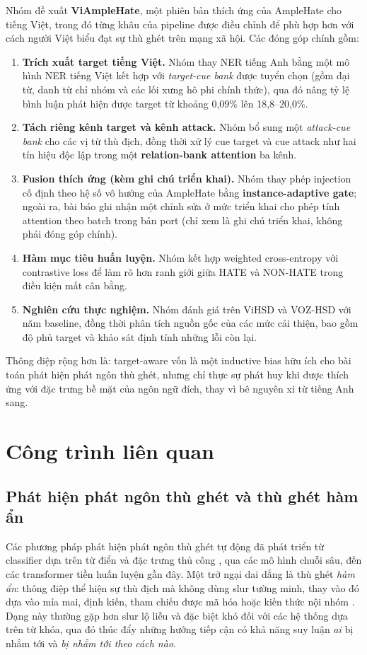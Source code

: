 \documentclass[11pt]{article}
\begin{document}
Nhóm đề xuất \textbf{ViAmpleHate}, một phiên bản thích ứng của AmpleHate cho tiếng Việt, trong đó từng khâu của pipeline được điều chỉnh để phù hợp hơn với cách người Việt biểu đạt sự thù ghét trên mạng xã hội. Các đóng góp chính gồm:
\begin{enumerate}
  \item \textbf{Trích xuất target tiếng Việt.} Nhóm thay NER tiếng Anh bằng một mô hình NER tiếng Việt kết hợp với \emph{target-cue bank} được tuyển chọn (gồm đại từ, danh từ chỉ nhóm và các lối xưng hô phi chính thức), qua đó nâng tỷ lệ bình luận phát hiện được target từ khoảng 0,09\% lên 18,8--20,0\%.
  \item \textbf{Tách riêng kênh target và kênh attack.} Nhóm bổ sung một \emph{attack-cue bank} cho các vị từ thù địch, đồng thời xử lý cue target và cue attack như hai tín hiệu độc lập trong một \textbf{relation-bank attention} ba kênh.
  \item \textbf{Fusion thích ứng (kèm ghi chú triển khai).} Nhóm thay phép injection cố định theo hệ số vô hướng của AmpleHate bằng \textbf{instance-adaptive gate}; ngoài ra, bài báo ghi nhận một chỉnh sửa ở mức triển khai cho phép tính attention theo batch trong bản port (chỉ xem là ghi chú triển khai, không phải đóng góp chính).
  \item \textbf{Hàm mục tiêu huấn luyện.} Nhóm kết hợp weighted cross-entropy với contrastive loss để làm rõ hơn ranh giới giữa HATE và NON-HATE trong điều kiện mất cân bằng.
  \item \textbf{Nghiên cứu thực nghiệm.} Nhóm đánh giá trên ViHSD và VOZ-HSD với năm baseline, đồng thời phân tích nguồn gốc của các mức cải thiện, bao gồm độ phủ target và khảo sát định tính những lỗi còn lại.
\end{enumerate}
Thông điệp rộng hơn là: target-aware vốn là một inductive bias hữu ích cho bài toán phát hiện phát ngôn thù ghét, nhưng chỉ thực sự phát huy khi được thích ứng với đặc trưng bề mặt của ngôn ngữ đích, thay vì bê nguyên xi từ tiếng Anh sang.

\section{Công trình liên quan}

\subsection{Phát hiện phát ngôn thù ghét và thù ghét hàm ẩn}
Các phương pháp phát hiện phát ngôn thù ghét tự động đã phát triển từ classifier dựa trên từ điển và đặc trưng thủ công \citep{davidson2017,schmidt2017survey}, qua các mô hình chuỗi sâu, đến các transformer tiền huấn luyện gần đây. Một trở ngại dai dẳng là thù ghét \emph{hàm ẩn}: thông điệp thể hiện sự thù địch mà không dùng slur tường minh, thay vào đó dựa vào mỉa mai, định kiến, tham chiếu được mã hóa hoặc kiến thức nội nhóm \citep{elsherief2021latent}. Dạng này thường gặp hơn slur lộ liễu và đặc biệt khó đối với các hệ thống dựa trên từ khóa, qua đó thúc đẩy những hướng tiếp cận có khả năng suy luận \emph{ai} bị nhắm tới và \emph{bị nhắm tới theo cách nào}.
\end{document}
